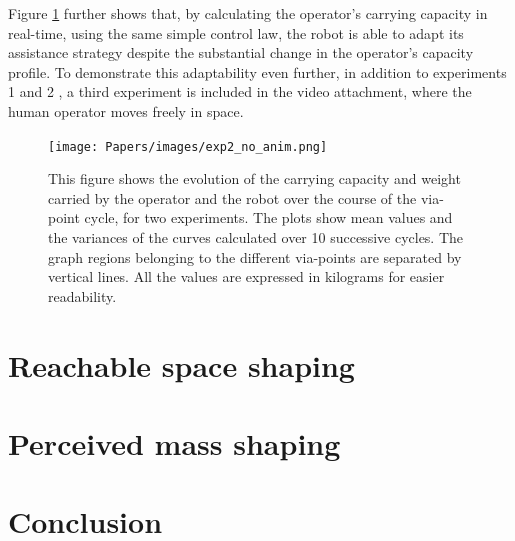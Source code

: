 Figure \ref{fig:experiment_results} further shows that, by calculating the operator's carrying capacity in real-time, { using the same simple control law, the robot is able to adapt its assistance strategy despite the substantial change in the operator's capacity profile.}
To demonstrate this adaptability even further, in addition to  experiments 1 and 2 , a third experiment is included in the video attachment, where the human operator moves freely in space. 

\begin{figure}[!t]
    \centering
    \texttt{[image: Papers/images/exp2\_no\_anim.png]}
    \caption{This figure shows the evolution of the carrying capacity and weight carried by the operator and the robot over the course of the via-point cycle, for two experiments. The plots show mean values and the variances of the curves calculated over 10 successive cycles. The graph regions belonging to the different via-points are separated by vertical lines.  All the values are expressed in kilograms for easier readability.}
    \label{fig:experiment_results}
\end{figure}


\section{Reachable space shaping}
\label{ch:human_robot_reachable_space}


\section{Perceived mass shaping}
\label{ch:human_robot_percieved_mass}

\section{Conclusion}

